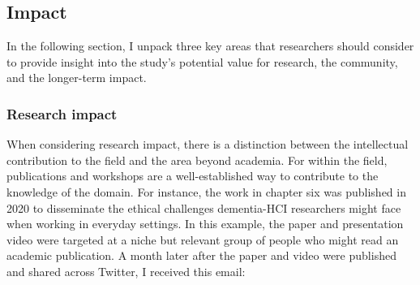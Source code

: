 \subsection{Impact}
\label{Impact}
In the following section, I unpack three key areas that researchers should consider to provide insight into the study's potential value for research, the community, and the longer-term impact.

\subsubsection{Research impact}
When considering research impact, there is a distinction between the intellectual contribution to the field and the area beyond academia. For within the field, publications and workshops are a well-established way to contribute to the knowledge of the domain. For instance, the work in chapter six was published in 2020 to disseminate the ethical challenges dementia-HCI researchers might face when working in everyday settings. In this example, the paper and presentation video were targeted at a niche but relevant group of people who might read an academic publication. A month later after the paper and video were published and shared across Twitter, I received this email:


